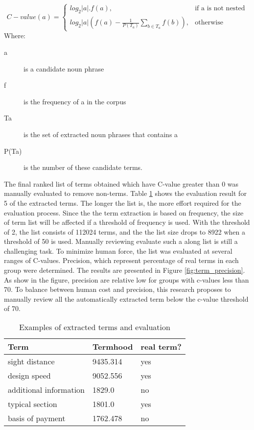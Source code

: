 \documentclass[Journal, InsideFigs, DoubleSpace]{ascelike} %
\begin{document}
\begin{enumerate}
	\begin{equation}
	C-value(a)=
	\begin{cases}
	log_2|a|.f(a), & \text{if a is not nested} \\
	log_2|a|(f(a)-\frac{1}{P(T_a)}\sum_{b\in T_a} f(b)), & \text{otherwise}
	\end{cases}
	\label{eq:cvalue}
	\end{equation}
	Where:
	\begin{description}
		\item[a] is a candidate noun phrase
		\item[f] is the frequency of a in the corpus
		\item[Ta] is the set of extracted noun phrases that contains a
		\item[P(Ta)] is the number of these candidate terms.
	\end{description}
\end{enumerate}
%
\par
The final ranked list of terms obtained which have C-value greater than 0 was manually evaluated to remove non-terms. Table \ref{table:term_evaluation} shows the evaluation result for 5 of the extracted terms. The longer the list is, the more effort required for the evaluation process. Since the the term extraction is based on frequency, the size of term list will be affected if a threshold of frequency is used. With the threshold of 2, the list consists of 112024  terms, and the the list size drops to 8922 when a threshold of 50 is used. Manually reviewing evaluate such a along list is still a challenging task. To minimize human force, the list was evaluated at several ranges of C-values. Precision, which represent percentage of real terms in each group were determined. The results are presented in Figure \ref{fig:term_precision}. As show in the figure, precision are relative low for groups with c-values less than 70. To balance between human cost and precision, this research proposes to manually review all the automatically extracted term below the c-value threshold of 70.
%
\begin{table} [t]
	\caption{Examples of extracted terms and evaluation}
	\label{table:term_evaluation}
	\centering
	\small
	\renewcommand{\arraystretch}{1.25}
	\begin{tabular}{l l l}
		\hline
		\textbf{Term} & \textbf{Termhood} & \textbf{real term?}\\
		\hline
		sight distance		& 9435.314 & yes\\
		design speed & 9052.556 & yes \\
		additional information & 1829.0 & no\\
		typical section & 1801.0  & yes\\
		basis of payment & 1762.478 & no\\
		\hline
	\end{tabular}
	
	\normalsize
\end{table}
\end{document}
